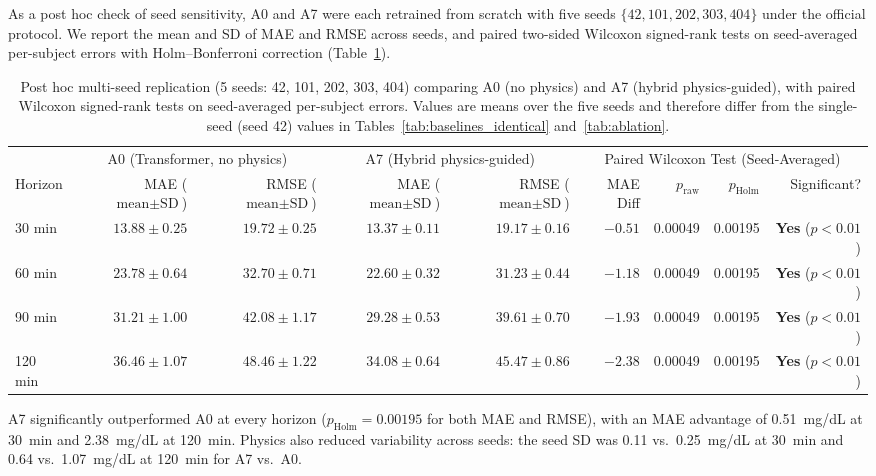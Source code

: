 \documentclass[journal]{IEEEtran}
\begin{document}
As a post hoc check of seed sensitivity, A0 and A7 were each retrained from scratch with five seeds $\{42, 101, 202, 303, 404\}$ under the official protocol. We report the mean and SD of MAE and RMSE across seeds, and paired two-sided Wilcoxon signed-rank tests on seed-averaged per-subject errors with Holm--Bonferroni correction (Table~\ref{tab:multiseed}).

\begin{table}[t]
\centering
\caption{Post hoc multi-seed replication (5 seeds: 42, 101, 202, 303, 404) comparing A0 (no physics) and A7 (hybrid physics-guided), with paired Wilcoxon signed-rank tests on seed-averaged per-subject errors. Values are means over the five seeds and therefore differ from the single-seed (seed 42) values in Tables~\ref{tab:baselines_identical} and~\ref{tab:ablation}.}
\label{tab:multiseed}
\footnotesize
\setlength{\tabcolsep}{4.5pt}
\begin{tabular}{lrrrrrrrr}
\toprule
& \multicolumn{2}{c}{A0 (Transformer, no physics)} & \multicolumn{2}{c}{A7 (Hybrid physics-guided)} & \multicolumn{4}{c}{Paired Wilcoxon Test (Seed-Averaged)} \\
\cmidrule(lr){2-3} \cmidrule(lr){4-5} \cmidrule(lr){6-9}
Horizon & MAE ($\text{mean}\pm\text{SD}$) & RMSE ($\text{mean}\pm\text{SD}$) & MAE ($\text{mean}\pm\text{SD}$) & RMSE ($\text{mean}\pm\text{SD}$) & MAE Diff & $p_{\text{raw}}$ & $p_{\text{Holm}}$ & Significant? \\
\midrule
30 min & $13.88 \pm 0.25$ & $19.72 \pm 0.25$ & $\mathbf{13.37 \pm 0.11}$ & $\mathbf{19.17 \pm 0.16}$ & $-0.51$ & 0.00049 & 0.00195 & \textbf{Yes} ($p < 0.01$) \\
60 min & $23.78 \pm 0.64$ & $32.70 \pm 0.71$ & $\mathbf{22.60 \pm 0.32}$ & $\mathbf{31.23 \pm 0.44}$ & $-1.18$ & 0.00049 & 0.00195 & \textbf{Yes} ($p < 0.01$) \\
90 min & $31.21 \pm 1.00$ & $42.08 \pm 1.17$ & $\mathbf{29.28 \pm 0.53}$ & $\mathbf{39.61 \pm 0.70}$ & $-1.93$ & 0.00049 & 0.00195 & \textbf{Yes} ($p < 0.01$) \\
120 min & $36.46 \pm 1.07$ & $48.46 \pm 1.22$ & $\mathbf{34.08 \pm 0.64}$ & $\mathbf{45.47 \pm 0.86}$ & $-2.38$ & 0.00049 & 0.00195 & \textbf{Yes} ($p < 0.01$) \\
\bottomrule
\end{tabular}
\end{table}

A7 significantly outperformed A0 at every horizon ($p_{\text{Holm}} = 0.00195$ for both MAE and RMSE), with an MAE advantage of 0.51~mg/dL at 30~min and 2.38~mg/dL at 120~min. Physics also reduced variability across seeds: the seed SD was 0.11 vs.\ 0.25~mg/dL at 30~min and 0.64 vs.\ 1.07~mg/dL at 120~min for A7 vs.\ A0.
\end{document}

